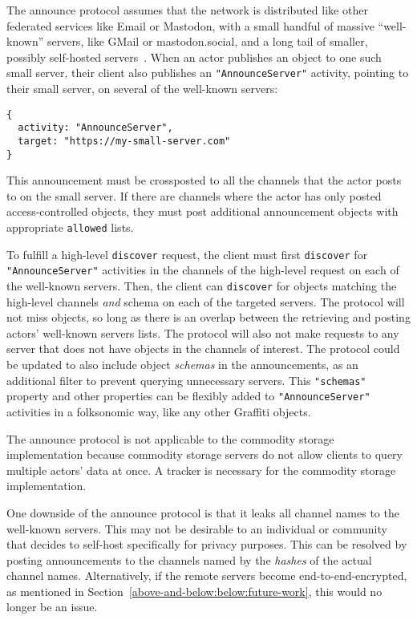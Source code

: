 The announce protocol assumes that the network is distributed like other
federated services like Email or Mastodon, with a small handful of
massive ``well-known'' servers, like GMail or mastodon.social, and a long
tail of smaller, possibly self-hosted servers~\cite{mastodonchallenges}.
When an actor publishes an object to one such small server,
their client also publishes an \texttt{"AnnounceServer"}
activity, pointing to their small server, on several of the well-known
servers:
\begin{verbatim}
{
  activity: "AnnounceServer",
  target: "https://my-small-server.com"
}
\end{verbatim}
This announcement must be crossposted to all the channels
that the actor posts to on the small server.
If there are channels where the actor has only posted
access-controlled objects, they must post additional announcement
objects with appropriate \texttt{allowed} lists.

To fulfill a high-level \texttt{discover} request,
the client must first \texttt{discover} for
\texttt{"AnnounceServer"} activities in the channels of
the high-level request
on each of the well-known servers.
Then, the client can \texttt{discover} for objects
matching the high-level channels \emph{and} schema on each of the targeted servers.
The protocol will not miss objects, so long as there
is an overlap between the retrieving and posting actors' well-known
servers lists.
The protocol will also not make requests to any server
that does not have objects in the channels of interest.
The protocol could be updated to also include object
\emph{schemas} in the announcements, as an additional
filter to prevent querying unnecessary servers.
This \texttt{"schemas"} property and other properties
can be flexibly added to \texttt{"AnnounceServer"} activities
in a folksonomic way, like any other Graffiti objects.

The announce protocol is not applicable to the commodity storage implementation
because commodity storage servers do not allow clients to
query multiple actors' data at once. A tracker is necessary
for the commodity storage implementation.

One downside of the announce protocol is that it leaks all
channel names to the well-known servers.
This may not be desirable to an individual or community that
decides to self-host specifically for privacy purposes.
This can be resolved by posting announcements to the channels
named by the \emph{hashes} of the actual channel names.
Alternatively, if the remote servers become end-to-end-encrypted,
as mentioned in Section~\ref{above-and-below:below:future-work},
this would no longer be an issue.

